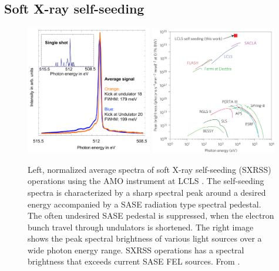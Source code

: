 \subsection{Soft X-ray self-seeding}
\begin{figure}
	\centering
		\includegraphics[width=0.49\textwidth]{images/Soft-X-ray-self-seeding.pdf}
		\includegraphics[width=0.49\textwidth]{images/spectral-brightness-fletcher-2015.jpg}
	\caption[Soft X-ray self-seeding spectra and brilliance of various lightsources.]{Left, normalized average spectra of soft X-ray self-seeding (SXRSS) operations using the AMO instrument at LCLS \cite[see][]{Bucher-2014-Unpublished}. The self-seeding spectra is characterized by a sharp spectral peak around a desired energy accompanied by a SASE radiation type spectral pedestal. The often undesired SASE pedestal is suppressed, when the electron bunch travel through undulators is shortened. The right image shows the peak spectral brightness of various light sources over a wide photon energy range. SXRSS operations has a spectral brightness that exceeds current SASE FEL sources. From \citep{Fletcher-2015-NatPho}.}
	\label{fig:soft-xray-self-seeding}
\end{figure}
